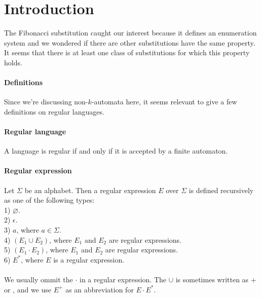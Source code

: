 \documentclass{article}
\begin{document}
\newcommand{\qed}{$\blacksquare$}

\section*{Introduction}
The Fibonacci substitution caught our interest because it defines an 
enumeration system and we wondered if there are other substitutions have the
same property. It seems that there is at least one class of substitutions
for which this property holds.
\paragraph{Definitions}
Since we're discussing non-$k$-automata here, it seems relevant to give a
few definitions on regular languages.
\paragraph{Regular language}
A language is regular if and only if it is accepted by a finite automaton.
\paragraph{Regular expression}
Let $\Sigma$ be an alphabet. Then a regular expression $E$ over $\Sigma$ is
defined recursively as one of the following types:\\
1) $\varnothing$.\\
2) $\epsilon$.\\
3) $a$, where $a \in \Sigma$.\\
4) $(E_1 \cup E_2)$, where $E_1$ and $E_2$ are regular expressions.\\
5) $(E_1 \cdot E_2)$, where $E_1$ and $E_2$ are regular expressions.\\
6) $E^*$, where $E$ is a regular expression.\\
\\
We usually ommit the $\cdot$ in a regular expression. The $\cup$ is sometimes
written as + or , and we use $E^+$ as an abbreviation for $E \cdot E^*$.
\end{document}
